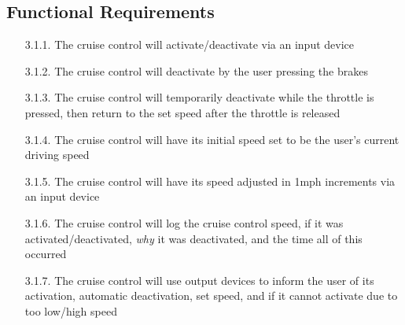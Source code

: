 \documentclass{article}
\begin{document}
	\subsection{Functional Requirements}
	\begin{enumerate}
		\item[3.1.1.] The cruise control will activate/deactivate via an input device
		\item[3.1.2.] The cruise control will deactivate by the user pressing the brakes
		\item[3.1.3.] The cruise control will temporarily deactivate while the throttle is pressed, then return to the set speed after the throttle is released
		\item[3.1.4.] The cruise control will have its initial speed set to be the user's current driving speed
		\item[3.1.5.] The cruise control will have its speed adjusted in 1mph increments via an input device
		\item[3.1.6.] The cruise control will log the cruise control speed, if it was activated/deactivated, \textit{why} it was deactivated, and the time all of this occurred
		\item[3.1.7.] The cruise control will use output devices to inform the user of its activation, automatic deactivation, set speed, and if it cannot activate due to too low/high speed
	\end{enumerate}
	
\end{document}
